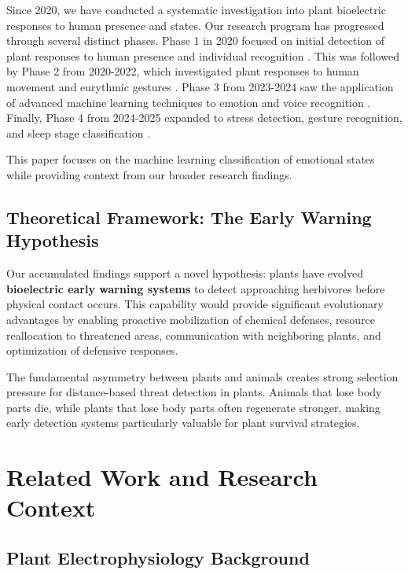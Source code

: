 \documentclass{article}
\begin{document}
Since 2020, we have conducted a systematic investigation into plant bioelectric responses to human presence and states. Our research program has progressed through several distinct phases. Phase 1 in 2020 focused on initial detection of plant responses to human presence and individual recognition \cite{oezkaya2020recognizing}. This was followed by Phase 2 from 2020-2022, which investigated plant responses to human movement and eurythmic gestures \cite{duerr2020eurythmic, de2023can}. Phase 3 from 2023-2024 saw the application of advanced machine learning techniques to emotion and voice recognition \cite{kruse2024leveraging, bhave2024using, fuchs2024plants}. Finally, Phase 4 from 2024-2025 expanded to stress detection, gesture recognition, and sleep stage classification \cite{gil2024can, smolin2025predicting}.

This paper focuses on the machine learning classification of emotional states while providing context from our broader research findings.

\subsection{Theoretical Framework: The Early Warning Hypothesis}

Our accumulated findings support a novel hypothesis: plants have evolved \textbf{bioelectric early warning systems} to detect approaching herbivores before physical contact occurs. This capability would provide significant evolutionary advantages by enabling proactive mobilization of chemical defenses, resource reallocation to threatened areas, communication with neighboring plants, and optimization of defensive responses.

The fundamental asymmetry between plants and animals creates strong selection pressure for distance-based threat detection in plants. Animals that lose body parts die, while plants that lose body parts often regenerate stronger, making early detection systems particularly valuable for plant survival strategies.

\section{Related Work and Research Context}

\subsection{Plant Electrophysiology Background}
\end{document}
